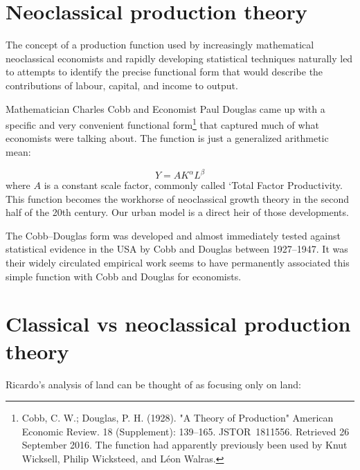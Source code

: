 \section{Neoclassical production theory}
The concept of a production function used by increasingly mathematical neoclassical economists and  rapidly developing statistical techniques  naturally led to attempts to identify the precise functional form that would describe the contributions of labour, capital, and income to output.
 
Mathematician Charles Cobb and Economist Paul Douglas came up with a specific and very convenient functional form\footnote{Cobb, C. W.; Douglas, P. H. (1928). "A Theory of Production"  American Economic Review. 18 (Supplement): 139–165. JSTOR 1811556. Retrieved 26 September 2016. The function had apparently previously been used by Knut Wicksell, Philip Wicksteed, and L\'eon Walras.} that captured much of what economists were talking about. The function is just a generalized arithmetic mean:
 
 \[Y=AK^\alpha L^\beta\]
 where $A$ is a constant scale factor, commonly called `Total Factor Productivity. This function becomes the workhorse of neoclassical growth theory in the second half  of the 20th century. Our urban model is a direct heir of those developments.



The Cobb–Douglas form was developed and almost immediately tested against statistical evidence in the USA by Cobb and Douglas between 1927–1947. It was  their widely circulated empirical work seems to have permanently associated this simple function with Cobb and Douglas for economists.

\section{Classical vs neoclassical production theory}

Ricardo's analysis of land  can be thought of as focusing only on land:

